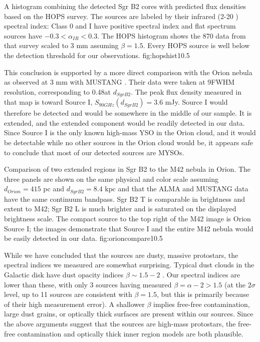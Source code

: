 \documentclass[twocolumn]{aastex61}
\newcommand{\dsgrb}{\ensuremath{8.4\textrm{~kpc}}\xspace}
\begin{document}
{A histogram combining the detected Sgr B2 cores with predicted flux densities
based on the HOPS \citep{Furlan2016a} survey.  The sources are labeled by their
infrared (2-20 \um) spectral index: Class 0 and I have positive spectral index
and flat spectrum sources have $-0.3 < \alpha_{IR} < 0.3$. The HOPS histogram
shows the 870 \um data from that survey scaled to 3 mm assuming $\beta=1.5$.
Every HOPS source is well below the detection threshold for our observations.}
{fig:hopshist}{1}{0.5\textwidth}

This conclusion is supported by a more direct comparison with the Orion nebula
as observed at 3 mm with MUSTANG \citep[][Figure
\ref{fig:orioncompare}]{Dicker2009a}.  Their data were taken at
9\arcsec FWHM resolution, corresponding to 0.48\arcsec at $d_{Sgr B2}$.  The
peak flux density measured in that map is toward Source I, $S_{90 GHz}(d_{Sgr
B2}) = 3.6$ mJy.  Source I would therefore  be detected and would be
somewhere in the middle of our sample.  It is  extended, and the
extended component would be readily detected in our data. 
Since Source I is the only known high-mass YSO in the Orion cloud, and it would
be detectable while no other sources in the Orion cloud would be, it appears
safe to conclude that most of our detected sources are MYSOs.


{Comparison of two extended \hii regions in Sgr B2 to the M42 nebula in Orion.
The three panels are shown on the same physical and color scale assuming
$d_{Orion} = 415$ pc and $d_{Sgr B2} = $\dsgrb and that the ALMA and MUSTANG
data have the same continuum bandpass.  Sgr B2 \hii T is comparable in
brightness and extent to M42; Sgr B2 \hii L is much brighter and is saturated
on the displayed brightness scale.  The compact source to the top right of the
M42 image is Orion Source I; the images demonstrate that Source I and the entire
M42 nebula would be easily detected in our data.
}
{fig:orioncompare}{1}{0.5\textwidth}

While we have concluded that the sources are dusty, massive protostars, the
spectral indices we measured are somewhat surprising.  Typical dust clouds in
the Galactic disk have dust opacity indices $\beta\sim1.5-2$
\citep{Schnee2010a,Shirley2011a,Sadavoy2016a}.  Our spectral indices are lower
than these, with only 3 sources having measured $\beta=\alpha-2 > 1.5$ (at the
$2\sigma$ level, up to 11 sources are consistent with $\beta=1.5$, but this is
primarily because of their high measurement error).  A shallower $\beta$
implies free-free contamination, large dust grains, or optically thick surfaces
are present within our sources.  Since the above arguments suggest that the
sources are high-mass protostars, the free-free contamination and optically
thick inner region models are both plausible.
\end{document}
